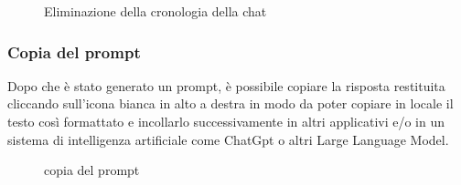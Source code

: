 \begin{figure}[H]
  \centering
  \caption{Eliminazione della cronologia della chat}
\end{figure}

\subsubsection{Copia del prompt}

Dopo che è stato generato un prompt, è possibile copiare la risposta restituita cliccando sull'icona bianca in alto a destra in modo da poter copiare in locale il testo così formattato e incollarlo successivamente in altri applicativi e/o in un sistema di intelligenza artificiale come ChatGpt o altri Large Language Model.

\begin{figure}[H]
    \centering
    \caption{copia del prompt}
  \end{figure}